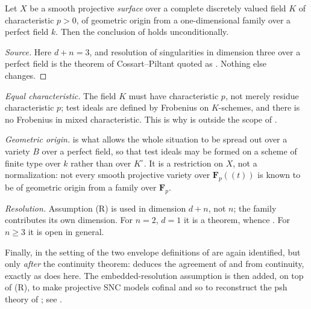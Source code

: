 \begin{corollary}
\label{cor:ch23-gjkm-surfaces}
Let \(X\) be a smooth projective \emph{surface} over a complete discretely
valued field \(K\) of characteristic \(p>0\), of geometric origin from a
one-dimensional family over a perfect field \(k\).  Then the conclusion of
 holds unconditionally.
\end{corollary}

\begin{proof}[Source]
Here \(d+n=3\), and resolution of singularities in dimension three over a
perfect field is the theorem of Cossart--Piltant quoted as
\cite[Theorem~6.3]{GJKM19}.  Nothing else changes.
\end{proof}

\begin{remark}
\label{rem:ch23-gjkm-hypotheses}
\emph{Equal characteristic.}  The field \(K\) must have characteristic
\(p\), not merely residue characteristic \(p\); test ideals are defined by
Frobenius on \(K\)-schemes, and there is no Frobenius in mixed
characteristic.  This is why  is outside the
scope of .

\emph{Geometric origin.}   is what allows
the whole situation to be spread out over a variety \(B\) over a perfect
field, so that test ideals may be formed on a scheme of finite type over
\(k\) rather than over \(K^\circ\).  It is a restriction on \(X\), not a
normalization: not every smooth projective variety over
\(\mathbf F_p(\!(t)\!)\) is known to be of geometric origin from a family
over \(\mathbf F_p\).

\emph{Resolution.}  Assumption \textup{(R)} is used in dimension \(d+n\),
not \(n\); the family contributes its own dimension.  For \(n=2\),
\(d=1\) it is a theorem, whence
.  For \(n\geq3\) it is open in general.

Finally, in the setting of
 the two envelope definitions of
 are again identified, but only \emph{after}
the continuity theorem: \cite[Section~9]{GJKM19} deduces the agreement of
 and  from continuity,
exactly as  does here.  The
embedded-resolution assumption is then added, on top of \textup{(R)}, to
make projective SNC models cofinal and so to reconstruct the psh theory of
; see .
\end{remark}

